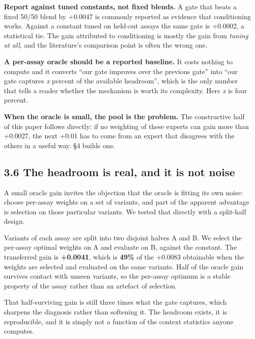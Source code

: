 \textbf{Report against tuned constants, not fixed blends.} A gate that beats a fixed 50/50 blend by +0.0047
is commonly reported as evidence that conditioning works. Against a constant tuned on held-out assays
the same gate is +0.0002, a statistical tie. The gain attributed to conditioning is mostly the gain from
\emph{tuning at all}, and the literature's comparison point is often the wrong one.

\textbf{A per-assay oracle should be a reported baseline.} It costs nothing to compute and it converts ``our
gate improves over the previous gate'' into ``our gate captures \emph{x} percent of the available headroom'',
which is the only number that tells a reader whether the mechanism is worth its complexity. Here \emph{x} is
four percent.

\textbf{When the oracle is small, the pool is the problem.} The constructive half of this paper follows
directly: if no weighting of these experts can gain more than +0.0027, the next +0.01 has to come from
an expert that disagrees with the others in a useful way. §4 builds one.

\hypertarget{the-headroom-is-real-and-it-is-not-noise}{%
\subsection{3.6 The headroom is real, and it is not noise}\label{the-headroom-is-real-and-it-is-not-noise}}

A small oracle gain invites the objection that the oracle is fitting its own noise: choose per-assay
weights on a set of variants, and part of the apparent advantage is selection on those particular
variants. We tested that directly with a split-half design.

Variants of each assay are split into two disjoint halves A and B. We select the per-assay optimal
weights on A and evaluate on B, against the constant. The transferred gain is \textbf{+0.0041}, which is
\textbf{49\%} of the +0.0083 obtainable when the weights are selected and evaluated on the same variants.
Half of the oracle gain survives contact with unseen variants, so the per-assay optimum is a stable
property of the assay rather than an artefact of selection.

That half-surviving gain is still three times what the gate captures, which sharpens the diagnosis
rather than softening it. The headroom exists, it is reproducible, and it is simply not a function of
the context statistics anyone computes.

